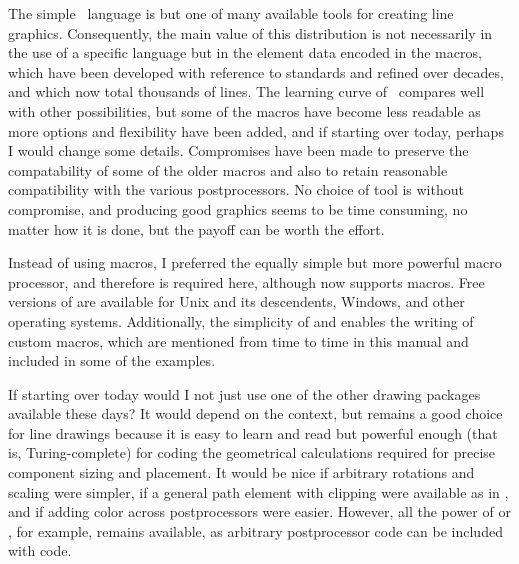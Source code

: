 The simple \pic\ language is but one of many available tools for creating
line graphics.  Consequently, the main value of this distribution
is not necessarily in the use of a specific language but in the
element data encoded in the macros, which have been developed with
reference to standards and refined over decades, and which now total
thousands of lines.  The learning curve of \pic\ compares well with
other possibilities, but some of the macros have become less readable
as more options and flexibility have been added, and if starting
over today, perhaps I would change some details.  Compromises have
been made to preserve the compatability of some of the older macros
and also to retain reasonable compatibility with
the various postprocessors.  No choice of tool is without compromise,
and producing good graphics seems to be time consuming, no matter how
it is done, but the payoff can be worth the effort.

Instead of using \pic macros, I preferred the equally simple but more
powerful \Mfour macro processor, and therefore \Mfour is required here,
although \dpic  now supports \pic macros.  Free versions of \Mfour
are available for Unix and its descendents, Windows, and other operating
systems.  Additionally, the simplicity of \Mfour and \pic enables the
writing of custom macros, which are mentioned from time to time in this
manual and included in some of the examples.

If starting over today would I not just use one of the other drawing
packages available these days?  It would depend on the context, but
\pic remains a good choice for line drawings because it is easy to learn
and read but powerful enough (that is, Turing-complete) for coding the
geometrical calculations required for precise component sizing and
placement. It would be nice if arbitrary rotations and scaling were
simpler, if a general path element with clipping were available as in
\Postscript, and if adding color across postprocessors were easier.
However, all the power of \Postscript or \TPGF, for example, remains
available, as arbitrary postprocessor code can be included with \pic code.

